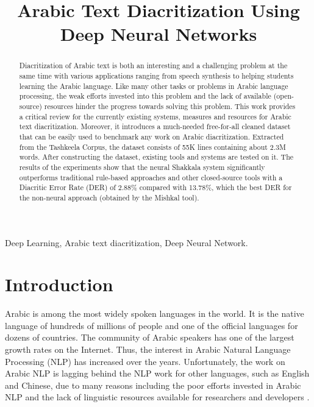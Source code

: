\documentclass[conference]{IEEEtran}
\begin{document}
\title{Arabic Text Diacritization Using Deep Neural Networks}

\author{
}

\maketitle
\IEEEpubidadjcol

\begin{abstract}
Diacritization of Arabic text is both an interesting and a challenging problem at the same time with various applications ranging from speech synthesis to helping students learning the Arabic language. Like many other tasks or problems in Arabic language processing, the weak efforts invested into this problem and the lack of available (open-source) resources hinder the progress towards solving this problem. This work provides a critical review for the currently existing systems, measures and resources for Arabic text diacritization. Moreover, it introduces a much-needed free-for-all cleaned dataset that can be easily used to benchmark any work on Arabic diacritization. Extracted from the Tashkeela Corpus, the dataset consists of 55K lines containing about 2.3M words. After constructing the dataset, existing tools and systems are tested on it. The results of the experiments show that the neural Shakkala system significantly outperforms traditional rule-based approaches and other closed-source tools with a Diacritic Error Rate (DER) of 2.88\% compared with 13.78\%, which the best DER for the non-neural approach (obtained by the Mishkal tool).
\end{abstract}

\begin{IEEEkeywords}
Deep Learning,
Arabic text diacritization,
Deep Neural Network.
\end{IEEEkeywords}

\section{Introduction}
\label{sec:intro}






Arabic is among the most widely spoken languages in the world. It is the native language of hundreds of millions of people and one of the official languages for dozens of countries. The community of Arabic speakers has one of the largest growth rates on the Internet. Thus, the interest in Arabic Natural Language Processing (NLP) has increased over the years. Unfortunately, the work on Arabic NLP is lagging behind the NLP work for other languages, such as English and Chinese, due to many reasons including the poor efforts invested in Arabic NLP and the lack of linguistic resources available for researchers and developers \cite{habash2010introduction,farghaly2009arabic,asa_survey}.
\end{document}
